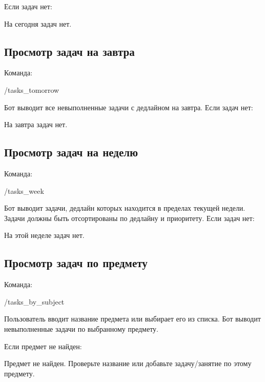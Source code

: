 \documentclass[10pt,a4paper,final]{article} %
\begin{document}
Если задач нет:

\begin{Code}
На сегодня задач нет.
\end{Code}

\subsection{Просмотр задач на завтра}

Команда:

\begin{Code}
/tasks_tomorrow
\end{Code}

Бот выводит все невыполненные задачи с дедлайном на завтра. Если задач нет:

\begin{Code}
На завтра задач нет.
\end{Code}

\subsection{Просмотр задач на неделю}

Команда:

\begin{Code}
/tasks_week
\end{Code}

Бот выводит задачи, дедлайн которых находится в пределах текущей недели. Задачи должны быть отсортированы по дедлайну и приоритету. Если задач нет:

\begin{Code}
На этой неделе задач нет.
\end{Code}

\subsection{Просмотр задач по предмету}

Команда:

\begin{Code}
/tasks_by_subject
\end{Code}

Пользователь вводит название предмета или выбирает его из списка. Бот выводит невыполненные задачи по выбранному предмету.

Если предмет не найден:

\begin{Code}
Предмет не найден. Проверьте название или добавьте задачу/занятие по этому предмету.
\end{Code}
\end{document}
